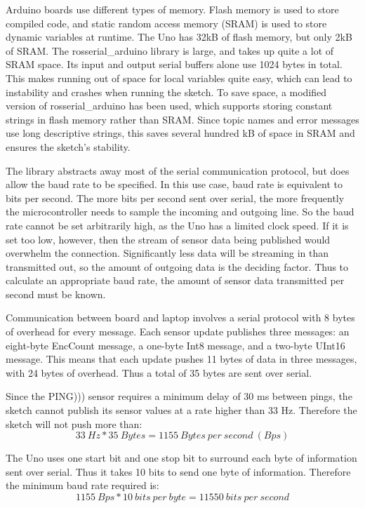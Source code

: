 Arduino boards use different types of memory. Flash memory is used to store compiled code, and static random access memory (SRAM) is used to store dynamic variables at runtime. The Uno has 32kB of flash memory, but only 2kB of SRAM. The rosserial\_arduino library is large, and takes up quite a lot of SRAM space. Its input and output serial buffers alone use 1024 bytes in total. This makes running out of space for local variables quite easy, which can lead to instability and crashes when running the sketch. To save space, a modified version of rosserial\_arduino has been used, which supports storing constant strings in flash memory rather than SRAM. Since topic names and error messages use long descriptive strings, this saves several hundred kB of space in SRAM and ensures the sketch's stability.

The library abstracts away most of the serial communication protocol, but does allow the baud rate to be specified. In this use case, baud rate is equivalent to bits per second. The more bits per second sent over serial, the more frequently the microcontroller needs to sample the incoming and outgoing line. So the baud rate cannot be set arbitrarily high, as the Uno has a limited clock speed. If it is set too low, however, then the stream of sensor data being published would overwhelm the connection. Significantly less data will be streaming in than transmitted out, so the amount of outgoing data is the deciding factor. Thus to calculate an appropriate baud rate, the amount of sensor data transmitted per second must be known.

Communication between board and laptop involves a serial protocol with 8 bytes of overhead for every message. Each sensor update publishes three messages: an eight-byte EncCount message, a one-byte Int8 message, and a two-byte UInt16 message. This means that each update pushes 11 bytes of data in three messages, with 24 bytes of overhead. Thus a total of 35 bytes are sent over serial.

Since the PING))) sensor requires a minimum delay of 30 ms between pings, the sketch cannot publish its sensor values at a rate higher than 33 Hz. Therefore the sketch will not push more than:
\[33\ Hz * 35\ Bytes = 1155\ Bytes\ per\ second\ (Bps)\]

The Uno uses one start bit and one stop bit to surround each byte of information sent over serial. Thus it takes 10 bits to send one byte of information. Therefore the minimum baud rate required is:
\[1155\ Bps * 10\ bits\ per\ byte = 11550\ bits\ per\ second\]

